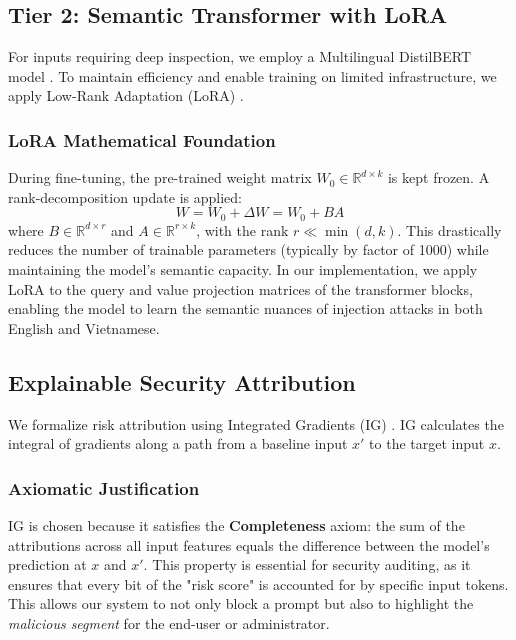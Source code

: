 \documentclass[10pt,conference]{IEEEtran}
\begin{document}
\subsection{Tier 2: Semantic Transformer with LoRA}
For inputs requiring deep inspection, we employ a Multilingual DistilBERT model \cite{distilbert}. To maintain efficiency and enable training on limited infrastructure, we apply Low-Rank Adaptation (LoRA) \cite{lora}. 

\subsubsection{LoRA Mathematical Foundation}
During fine-tuning, the pre-trained weight matrix $W_0 \in \mathbb{R}^{d \times k}$ is kept frozen. A rank-decomposition update is applied:
\begin{equation}
W = W_0 + \Delta W = W_0 + BA
\end{equation}
where $B \in \mathbb{R}^{d \times r}$ and $A \in \mathbb{R}^{r \times k}$, with the rank $r \ll \min(d, k)$. This drastically reduces the number of trainable parameters (typically by factor of 1000) while maintaining the model's semantic capacity. In our implementation, we apply LoRA to the query and value projection matrices of the transformer blocks, enabling the model to learn the semantic nuances of injection attacks in both English and Vietnamese.

\subsection{Explainable Security Attribution}
We formalize risk attribution using Integrated Gradients (IG) \cite{integrated_gradients}. IG calculates the integral of gradients along a path from a baseline input $x'$ to the target input $x$.

\subsubsection{Axiomatic Justification}
IG is chosen because it satisfies the \textbf{Completeness} axiom: the sum of the attributions across all input features equals the difference between the model's prediction at $x$ and $x'$. This property is essential for security auditing, as it ensures that every bit of the "risk score" is accounted for by specific input tokens. This allows our system to not only block a prompt but also to highlight the \textit{malicious segment} for the end-user or administrator.
\end{document}

